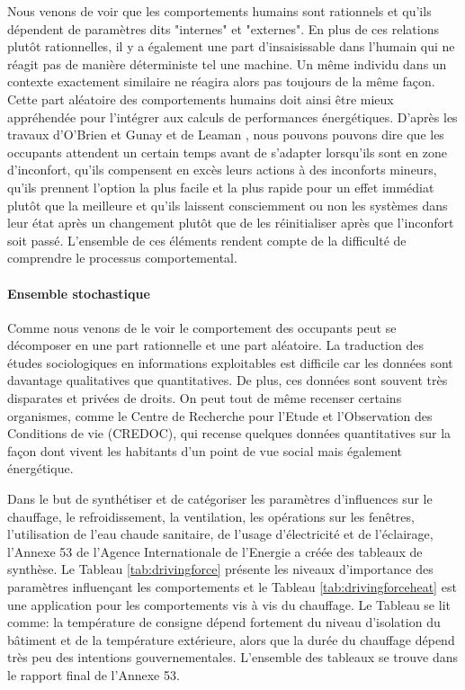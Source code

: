 Nous venons de voir que les comportements humains sont rationnels et qu'ils dépendent de paramètres dits "internes" et "externes". En plus de ces relations plutôt rationnelles, il y a également une part d'insaisissable dans l'humain qui ne réagit pas de manière déterministe tel une machine. Un même individu dans un contexte exactement similaire ne réagira alors pas toujours de la même façon. Cette part aléatoire des comportements humains doit ainsi être mieux appréhendée pour l'intégrer aux calculs de performances énergétiques. D'après les travaux d'O'Brien et Gunay \cite{O'Brien-14} et de Leaman \cite{Leaman-99}, nous pouvons pouvons dire que les occupants attendent un certain temps avant de s'adapter lorsqu'ils sont en zone d'inconfort, qu'ils compensent en excès leurs actions à des inconforts mineurs, qu'ils prennent l'option la plus facile et la plus rapide pour un effet immédiat plutôt que la meilleure et qu'ils laissent consciemment ou non les systèmes dans leur état après un changement plutôt que de les réinitialiser après que l'inconfort soit passé. L'ensemble de ces éléments rendent compte de la difficulté de comprendre le processus comportemental. 

\paragraph{Ensemble stochastique}

Comme nous venons de le voir le comportement des occupants peut se décomposer en une part rationnelle et une part aléatoire. La traduction des études sociologiques en informations exploitables est difficile car les données sont davantage qualitatives que quantitatives. De plus, ces données sont souvent très disparates et privées de droits. On peut tout de même recenser certains organismes, comme le Centre de Recherche pour l'Etude et l'Observation des Conditions de vie (CREDOC), qui recense quelques données quantitatives sur la façon dont vivent les habitants d'un point de vue social mais également énergétique. 

Dans le but de synthétiser et de catégoriser les paramètres d'influences sur le chauffage, le refroidissement, la ventilation, les opérations sur les fenêtres, l'utilisation de l'eau chaude sanitaire, de l'usage d'électricité et de l'éclairage, l'Annexe 53 \cite{Annex-53-1} de l'Agence Internationale de l'Energie a créée des tableaux de synthèse. Le Tableau \ref{tab:drivingforce} présente les niveaux d'importance des paramètres influençant les comportements et le Tableau \ref{tab:drivingforceheat} est une application pour les comportements vis à vis du chauffage. Le Tableau se lit comme: la température de consigne dépend fortement du niveau d'isolation du bâtiment et de la température extérieure, alors que la durée du chauffage dépend très peu des intentions gouvernementales. L'ensemble des tableaux se trouve dans le rapport final de l'Annexe 53.

